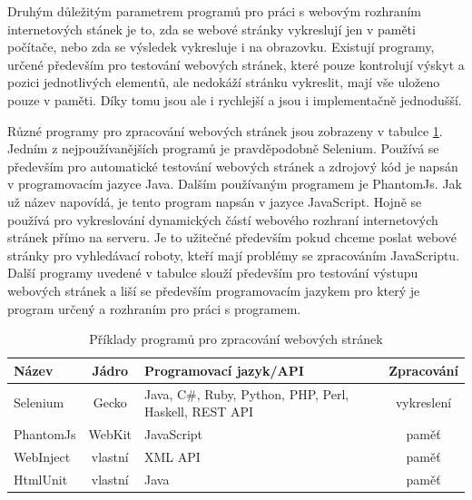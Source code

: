 \documentclass[thesis=M,czech]{FITthesis}[2013/05/10]
\begin{document}
Druhým důležitým parametrem programů pro práci s webovým rozhraním internetových stánek je to, zda se webové stránky vykreslují jen v paměti počítače, nebo zda se výsledek vykresluje i na obrazovku. Existují programy, určené především pro testování webových stránek, které pouze kontrolují výskyt a pozici jednotlivých elementů, ale nedokáží stránku vykreslit, mají vše uloženo pouze v paměti. Díky tomu jsou ale i rychlejší a jsou i implementačně jednodušší. 

Různé programy pro zpracování webových stránek jsou zobrazeny v tabulce \ref{tab:web-engines}. Jedním z nejpoužívanějších programů je pravděpodobně Selenium. Používá se především pro automatické testování webových stránek a zdrojový kód je napsán v programovacím jazyce Java. Dalším používaným programem je PhantomJs. Jak už název napovídá, je tento program napsán v jazyce JavaScript. Hojně se používá pro vykreslování dynamických částí webového rozhraní internetových stránek přímo na serveru. Je to užitečné především pokud chceme poslat webové stránky pro vyhledávací roboty, kteří mají problémy se zpracováním JavaScriptu. Další programy uvedené v tabulce slouží především pro testování výstupu webových stránek a liší se především programovacím jazykem pro který je program určený a rozhraním pro práci s programem.

\begin{table}[h]
\centering
\caption{Příklady programů pro zpracování webových stránek}\label{tab:web-engines}
\begin{tabular}{| l | c | p{5cm} | c |}
	\hline
	\textbf{Název} & 
	\textbf{Jádro} & 
	\textbf{Programovací jazyk/API} & 
	\textbf{Zpracování} \\ \hline
	
	Selenium & %
	Gecko & 
	Java, C\#, Ruby, Python, PHP, Perl, Haskell, REST API & 
	vykreslení \\ \hline
	
	PhantomJs & %
	WebKit & 
	JavaScript & 
	paměť \\ \hline
	
	WebInject & %
	vlastní &
	XML API &
	paměť \\ \hline
	
	HtmlUnit & %
	vlastní &
	Java &
	paměť \\ \hline
		
\end{tabular}
\end{table}
\end{document}

